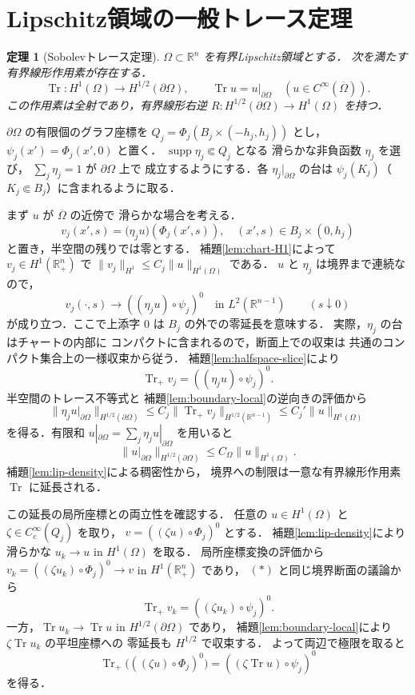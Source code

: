 \documentclass[a5paper,10pt,onecolumn]{jsarticle}
\makeatletter
\theoremstyle{mathnotetheorem}
\newtheorem{theorem}{定理}[section]
\renewcommand{\proofname}{証明}
\renewenvironment{proof}[1][\proofname]{%
  \par\pushQED{\qed}\normalfont\topsep4\p@\@plus2\p@\relax
  \trivlist\item[\hskip\labelsep\bfseries #1]\ignorespaces
}{\popQED\endtrivlist\@endpefalse}
\newcommand{\norm}[1]{\lVert #1\rVert}
\makeatother
\begin{document}
\section{Lipschitz領域の一般トレース定理}
\begin{theorem}[Sobolevトレース定理]
$\Omega\subset\mathbb R^n$ を有界Lipschitz領域とする．
次を満たす有界線形作用素が存在する．
\[
 \operatorname{Tr}:H^1(\Omega)\to H^{1/2}(\partial\Omega),
 \qquad\operatorname{Tr}u=u|_{\partial\Omega}
 \quad(u\in C^\infty(\overline\Omega)).
\]
この作用素は全射であり，有界線形右逆
$R:H^{1/2}(\partial\Omega)\to H^1(\Omega)$ を持つ．
\end{theorem}
\begin{proof}
$\partial\Omega$ の有限個のグラフ座標を
$Q_j=\Phi_j(B_j\times(-h_j,h_j))$ とし，
$\psi_j(x')=\Phi_j(x',0)$ と置く．
$\operatorname{supp}\eta_j\Subset Q_j$ となる
滑らかな非負函数 $\eta_j$ を選び，
$\sum_j\eta_j=1$ が $\partial\Omega$ 上で
成立するようにする．各 $\eta_j|_{\partial\Omega}$ の台は
$\psi_j(K_j)$（$K_j\Subset B_j$）に含まれるように取る．

まず $u$ が $\overline\Omega$ の近傍で
滑らかな場合を考える．
\[
 v_j(x',s)=
 \bigl(\eta_ju\bigr)(\Phi_j(x',s)),
 \quad (x',s)\in B_j\times(0,h_j)
\]
と置き，半空間の残りでは零とする．
補題\ref{lem:chart-H1}によって
$v_j\in H^1(\mathbb R^n_+)$ で
$\norm{v_j}_{H^1}\le C_j\norm u_{H^1(\Omega)}$
である．
$u$ と $\eta_j$ は境界まで連続なので，
\[
 v_j(\cdot,s)\longrightarrow
 ((\eta_j u)\circ\psi_j)^0
 \quad\text{in }L^2(\mathbb R^{n-1})
 \qquad(s\downarrow0)
\]
が成り立つ．ここで上添字 $0$ は
$B_j$ の外での零延長を意味する．
実際，$\eta_j$ の台はチャートの内部に
コンパクトに含まれるので，断面上での収束は
共通のコンパクト集合上の一様収束から従う．
補題\ref{lem:halfspace-slice}により
\[
 \operatorname{Tr}_+v_j=((\eta_j u)\circ\psi_j)^0.
 \tag{$*$}
\]
半空間のトレース不等式と
補題\ref{lem:boundary-local}の逆向きの評価から
\[
 \norm{\eta_j u|_{\partial\Omega}}_{H^{1/2}(\partial\Omega)}
 \le C_j\norm{\operatorname{Tr}_+v_j}_{H^{1/2}(\mathbb R^{n-1})}
 \le C_j'\norm u_{H^1(\Omega)}
\]
を得る．有限和 $u|_{\partial\Omega}
=\sum_j\eta_j u|_{\partial\Omega}$ を用いると
\[
 \norm{u|_{\partial\Omega}}_{H^{1/2}(\partial\Omega)}
 \le C_\Omega\norm u_{H^1(\Omega)}.
\]
補題\ref{lem:lip-density}による稠密性から，
境界への制限は一意な有界線形作用素
$\operatorname{Tr}$ に延長される．

この延長の局所座標との両立性を確認する．
任意の $u\in H^1(\Omega)$ と
$\zeta\in C_c^\infty(Q_j)$ を取り，
$v=((\zeta u)\circ\Phi_j)^0$ とする．
補題\ref{lem:lip-density}により
滑らかな $u_k\to u$ in $H^1(\Omega)$ を取る．
局所座標変換の評価から
$v_k=((\zeta u_k)\circ\Phi_j)^0\to v$
in $H^1(\mathbb R^n_+)$ であり，
$(*)$ と同じ境界断面の議論から
\[
 \operatorname{Tr}_+v_k
 =((\zeta u_k)\circ\psi_j)^0.
\]
一方，$\operatorname{Tr}u_k\to\operatorname{Tr}u$
in $H^{1/2}(\partial\Omega)$ であり，
補題\ref{lem:boundary-local}により
$\zeta\operatorname{Tr}u_k$ の平坦座標への
零延長も $H^{1/2}$ で収束する．
よって両辺で極限を取ると
\[
 \operatorname{Tr}_+
  \bigl(((\zeta u)\circ\Phi_j)^0\bigr)
 =((\zeta\operatorname{Tr}u)\circ\psi_j)^0
 \tag{$**$}
\]
を得る．


\end{proof}
\end{document}
